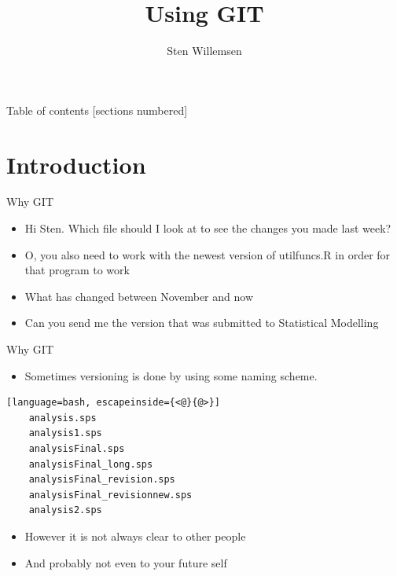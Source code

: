 \documentclass[12pt]{beamer}
\author{Sten Willemsen}
\title{Using GIT}
\begin{document}
\begin{frame}
	\titlepage
\end{frame}


\begin{frame}{Table of contents}
  [sections numbered]
\end{frame}

\section{Introduction}

\begin{frame}{Why GIT}
	\begin{itemize}
	\item Hi Sten. Which file should I look at to see the changes you made last week?
	\item O, you also need to work with the newest version of utilfuncs.R in order for that program to work
	\item What has changed between November and now
	\item Can you send me the version that was submitted to Statistical Modelling
	\end{itemize}
\end{frame}

\begin{frame}[fragile]{Why GIT}
	\begin{itemize}
	\item Sometimes versioning is done by using some naming scheme. 
	\end{itemize}
	\begin{lstlisting}[language=bash, escapeinside={<@}{@>}]
	analysis.sps
	analysis1.sps
	analysisFinal.sps
	analysisFinal_long.sps
	analysisFinal_revision.sps
	analysisFinal_revisionnew.sps
	analysis2.sps
	\end{lstlisting}
\begin{itemize}
\item 	However it is not always clear to other people
\item 	And probably not even to your future self
\end{itemize}
\end{frame}
\end{document}
